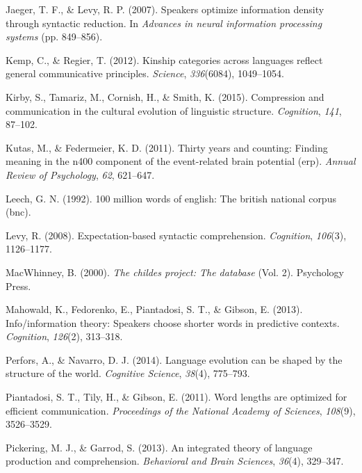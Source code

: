 \documentclass[man,floatsintext]{apa6}
\begin{document}
\leavevmode\hypertarget{ref-jaeger2007}{}%
Jaeger, T. F., \& Levy, R. P. (2007). Speakers optimize information density through syntactic reduction. In \emph{Advances in neural information processing systems} (pp. 849--856).

\leavevmode\hypertarget{ref-kemp2012kinship}{}%
Kemp, C., \& Regier, T. (2012). Kinship categories across languages reflect general communicative principles. \emph{Science}, \emph{336}(6084), 1049--1054.

\leavevmode\hypertarget{ref-kirby2015compression}{}%
Kirby, S., Tamariz, M., Cornish, H., \& Smith, K. (2015). Compression and communication in the cultural evolution of linguistic structure. \emph{Cognition}, \emph{141}, 87--102.

\leavevmode\hypertarget{ref-kutas2011}{}%
Kutas, M., \& Federmeier, K. D. (2011). Thirty years and counting: Finding meaning in the n400 component of the event-related brain potential (erp). \emph{Annual Review of Psychology}, \emph{62}, 621--647.

\leavevmode\hypertarget{ref-leech1992}{}%
Leech, G. N. (1992). 100 million words of english: The british national corpus (bnc).

\leavevmode\hypertarget{ref-levy2008}{}%
Levy, R. (2008). Expectation-based syntactic comprehension. \emph{Cognition}, \emph{106}(3), 1126--1177.

\leavevmode\hypertarget{ref-macwhinney2000}{}%
MacWhinney, B. (2000). \emph{The childes project: The database} (Vol. 2). Psychology Press.

\leavevmode\hypertarget{ref-mahowald2013}{}%
Mahowald, K., Fedorenko, E., Piantadosi, S. T., \& Gibson, E. (2013). Info/information theory: Speakers choose shorter words in predictive contexts. \emph{Cognition}, \emph{126}(2), 313--318.

\leavevmode\hypertarget{ref-perfors2014language}{}%
Perfors, A., \& Navarro, D. J. (2014). Language evolution can be shaped by the structure of the world. \emph{Cognitive Science}, \emph{38}(4), 775--793.

\leavevmode\hypertarget{ref-piantadosi2011}{}%
Piantadosi, S. T., Tily, H., \& Gibson, E. (2011). Word lengths are optimized for efficient communication. \emph{Proceedings of the National Academy of Sciences}, \emph{108}(9), 3526--3529.

\leavevmode\hypertarget{ref-pickering2013}{}%
Pickering, M. J., \& Garrod, S. (2013). An integrated theory of language production and comprehension. \emph{Behavioral and Brain Sciences}, \emph{36}(4), 329--347.
\end{document}

